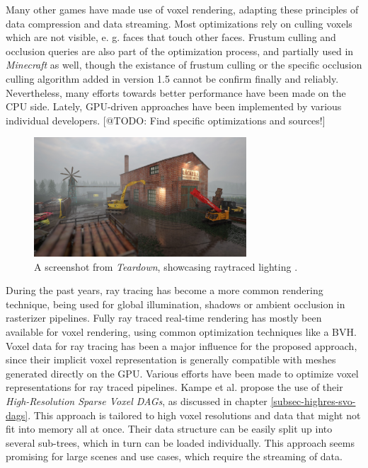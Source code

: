 \noindent
Many other games have made use of voxel rendering, adapting these principles of data compression and data streaming. 
Most optimizations rely on culling voxels which are not visible, e. g. faces that touch other faces.
Frustum culling and occlusion queries are also part of the optimization process, and partially used in \emph{Minecraft} 
as well, though the existance of frustum culling or the specific occlusion culling algorithm added in version 1.5 
cannot be confirm finally and reliably. Nevertheless, many efforts towards better performance have been made on the 
\ac{CPU} side. Lately, \ac{GPU}-driven approaches have been implemented by various individual developers. 
[@TODO: Find specific optimizations and sources!]  \\

\begin{figure}[h]
    \centering
    \includegraphics[width=300px]{images/graphics/teardown-ray-tracing.jpg}
    \caption{A screenshot from \emph{Teardown}, showcasing raytraced lighting \cite{TeardownSteam2022}.}
    \label{fig:teardown-raytracing}
\end{figure}

\noindent
During the past years, ray tracing has become a more common rendering technique, being used for global illumination, 
shadows or ambient occlusion in rasterizer pipelines. Fully ray traced real-time rendering has mostly been available 
for voxel rendering, using common optimization techniques like a \ac{BVH}. Voxel data for ray tracing has been a 
major influence for the proposed approach, since their implicit voxel representation is generally compatible with meshes 
generated directly on the \ac{GPU}. Various efforts have been made to optimize voxel representations for ray traced 
pipelines. Kampe et al. \cite{Kampe2013} propose the use of their \emph{High-Resolution Sparse Voxel \ac{DAG}s}, 
as discussed in chapter \ref{subsec-highres-svo-dags}. This approach is tailored to high voxel resolutions and data 
that might not fit into memory all at once. Their data structure can be easily split up into several sub-trees, which 
in turn can be loaded individually. This approach seems promising for large scenes and use cases, which require the 
streaming of data. 


